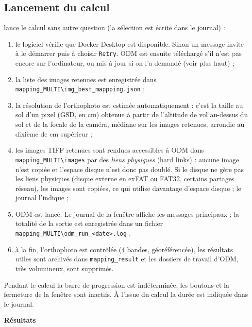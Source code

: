 \documentclass[a4paper,11pt]{report}
\DeclareRobustCommand{\bouton}[1]{\texorpdfstring{\fbox{\small\textsf{#1}}}{#1}}
\begin{document}
\subsection{Lancement du calcul}
\bouton{Build the map} lance le calcul sans autre question (la sélection est écrite dans le journal) :
\begin{enumerate}
	\item le logiciel vérifie que Docker Desktop est disponible. Sinon un message invite à le démarrer puis à choisir \texttt{Retry}. ODM est ensuite téléchargé s'il n'est pas encore sur l'ordinateur, ou mis à jour si on l'a demandé (voir plus haut) ;
	\item la liste des images retenues est enregistrée dans \texttt{mapping\_MULTI\textbackslash img\_best\_mappping.json} ;
	\item la résolution de l'orthophoto est estimée automatiquement : c'est la taille au sol d'un pixel (GSD, en cm) obtenue à partir de l'altitude de vol au-dessus du sol et de la focale de la caméra, médiane sur les images retenues, arrondie au dixième de cm supérieur ;
	\item les images TIFF retenues sont rendues accessibles à ODM dans \texttt{mapping\_MULTI\textbackslash images} par des \emph{liens physiques} (hard links) : aucune image n'est copiée et l'espace disque n'est donc pas doublé. Si le disque ne gère pas les liens physiques (disque externe en exFAT ou FAT32, certains partages réseau), les images sont copiées, ce qui utilise davantage d'espace disque ; le journal l'indique ;
	\item ODM est lancé. Le journal de la fenêtre affiche les messages principaux ; la totalité de la sortie est enregistrée dans un fichier \texttt{mapping\_MULTI\textbackslash odm\_run\_<date>.log} ;
	\item à la fin, l'orthophoto est contrôlée (4 bandes, géoréférencée), les résultats utiles sont archivés dans \texttt{mapping\_result} et les dossiers de travail d'ODM, très volumineux, sont supprimés.
\end{enumerate}
Pendant le calcul la barre de progression est indéterminée, les boutons et la fermeture de la fenêtre sont inactifs. À l'issue du calcul la durée est indiquée dans le journal.

\textbf{Résultats}\label{sec:step6_mapping_result}
\end{document}

